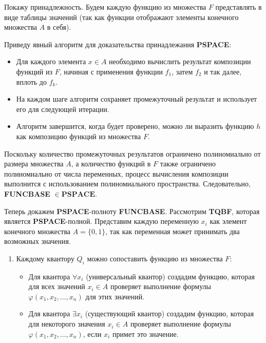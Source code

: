\begin{solution}
    Покажу принадлежность. Будем каждую функцию из множества $F$ представлять в виде таблицы значений (так как функции отображают элементы конечного множества $A$ в себя).

    Приведу явный алгоритм для доказательства принадлежания \textbf{PSPACE}:
    \begin{itemize}
        \item Для каждого элемента $x \in A$ необходимо вычислить результат композиции функций из $F$, начиная с применения функции $f_1$, затем $f_2$ и так далее, вплоть до $f_k$.
        \item На каждом шаге алгоритм сохраняет промежуточный результат и использует его для следующей итерации.
        \item Алгоритм завершится, когда будет проверено, можно ли выразить функцию $h$ как композицию функций из множества $F$.
    \end{itemize}

    Поскольку количество промежуточных результатов ограничено полиномиально от размера множества $A$, а количество функций в $F$ также ограничено полиномиально от числа переменных,
    процесс вычисления композиции выполнится с использованием полиномиального пространства.
    Следовательно, \textbf{FUNCBASE} $\in \mathbf{PSPACE}$.

    Теперь докажем \textbf{PSPACE}-полноту \textbf{FUNCBASE}. Рассмотрим \textbf{TQBF}, которая является \textbf{PSPACE}-полной.
    Представим каждую переменную $x_i$ как элемент конечного множества $A = \{0, 1\}$, так как переменная может принимать два возможных значения.

    \begin{enumerate}
        \item Каждому квантору $Q_i$ можно сопоставить функцию из множества $F$:
              \begin{itemize}
                  \item Для квантора $\forall x_i$ (универсальный квантор) создадим функцию, которая для всех значений $x_i \in A$ проверяет выполнение формулы $\varphi(x_1, x_2, \dots, x_n)$ для этих значений.
                  \item Для квантора $\exists x_i$ (существующий квантор) создадим функцию, которая для некоторого значения $x_i \in A$ проверяет выполнение формулы $\varphi(x_1, x_2, \dots, x_n)$, если $x_i$ примет это значение.
              \end{itemize}


\end{enumerate}
\end{solution}
